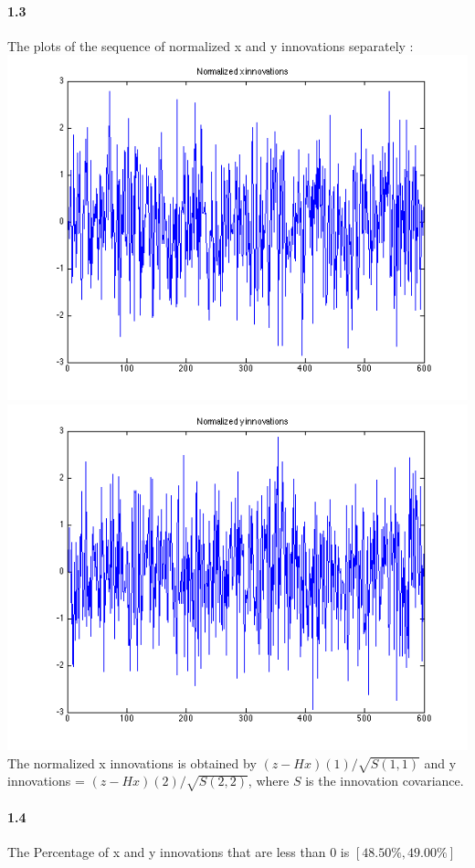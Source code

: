 \documentclass[a4paper]{article}
\begin{document}
\paragraph{1.3 } The plots of the sequence of normalized x and y innovations separately : \\
\includegraphics[scale=.4]{target_1_x_inno.png}
\includegraphics[scale=.4]{target_1_y_inno.png} \\

The normalized x innovations is obtained by $(z - Hx)(1)/\sqrt{S(1,1)}$ and y innovations = $(z - Hx)(2)/\sqrt{S(2,2)}$, where $S$ is the innovation covariance.\\

\paragraph{1.4 } The Percentage of x and y innovations that are less than 0 is $[ 48.50\%, 49.00\% ]$ \\
\end{document}
